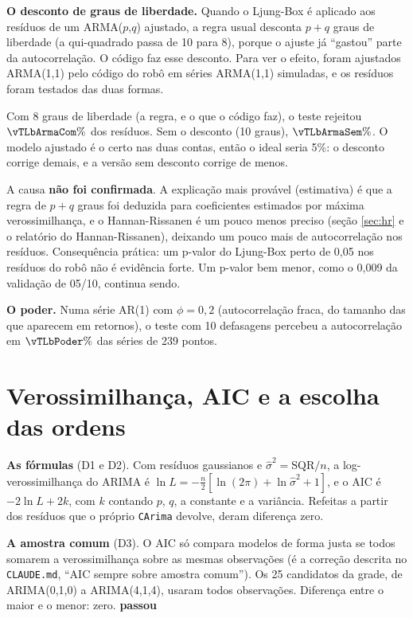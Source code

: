 \documentclass[11pt,a4paper]{article}
\newcommand{\ok}{\textcolor{cok}{\textbf{passou}}}
\begin{document}
\textbf{O desconto de graus de liberdade.} Quando o Ljung-Box é aplicado aos resíduos de um ARMA($p$,$q$)
ajustado, a regra usual desconta $p + q$ graus de liberdade (a qui-quadrado passa de 10 para 8), porque o ajuste
já ``gastou'' parte da autocorrelação. O código faz esse desconto. Para ver o efeito, foram ajustados ARMA(1,1)
pelo código do robô em \vTLbArmaR{} séries ARMA(1,1) simuladas, e os resíduos foram testados das duas formas.

\begin{cuidado}
Com 8 graus de liberdade (a regra, e o que o código faz), o teste rejeitou $\vTLbArmaCom\%$ dos resíduos. Sem o
desconto (10 graus), $\vTLbArmaSem\%$. O modelo ajustado é o certo nas duas contas, então o ideal seria 5\%:
o desconto corrige demais, e a versão sem desconto corrige de menos.

A causa \textbf{não foi confirmada}. A explicação mais provável (estimativa) é que a regra de $p + q$ graus foi
deduzida para coeficientes estimados por máxima verossimilhança, e o Hannan-Rissanen é um pouco menos preciso
(seção \ref{sec:hr} e o relatório do Hannan-Rissanen), deixando um pouco mais de autocorrelação nos resíduos.
Consequência prática: um p-valor do Ljung-Box perto de 0,05 nos resíduos do robô não é evidência forte. Um
p-valor bem menor, como o 0,009 da validação de 05/10, continua sendo.
\end{cuidado}

\textbf{O poder.} Numa série AR(1) com $\phi = 0{,}2$ (autocorrelação fraca, do tamanho das que aparecem em
retornos), o teste com 10 defasagens percebeu a autocorrelação em $\vTLbPoder\%$ das \vTLbPoderR{} séries de 239
pontos.

\section{Verossimilhança, AIC e a escolha das ordens}

\textbf{As fórmulas} (D1 e D2). Com resíduos gaussianos e $\hat\sigma^2 = \text{SQR}/n$, a log-verossimilhança do
ARIMA é $\ln L = -\tfrac{n}{2}[\ln(2\pi) + \ln\hat\sigma^2 + 1]$, e o AIC é $-2\ln L + 2k$, com $k$ contando
$p$, $q$, a constante e a variância. Refeitas a partir dos resíduos que o próprio \texttt{CArima} devolve, deram
diferença zero.

\textbf{A amostra comum} (D3). O AIC só compara modelos de forma justa se todos somarem a verossimilhança sobre
as mesmas observações (é a correção descrita no \texttt{CLAUDE.md}, ``AIC sempre sobre amostra comum''). Os 25
candidatos da grade, de ARIMA(0,1,0) a ARIMA(4,1,4), usaram todos \vTAmostraComum{} observações. Diferença entre
o maior e o menor: zero. \ok
\end{document}
